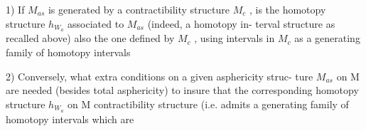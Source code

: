 1)  If $M_{as}$ is generated by a contractibility structure $M_c$ ,  is the
homotopy structure $h_{W_a}$ associated to $M_{as}$  (indeed, a  homotopy in-%
terval structure as recalled above) also the one defined by $M_c$ ,  using
intervals in $M_c$ as a generating family of homotopy intervals

2)  Conversely, what extra conditions on a given asphericity struc-%
ture $M_{as}$ on M are needed (besides total asphericity) to insure that the
corresponding homotopy structure $h_{W_a}$ on M   contractibility structure 
(i.e. admits a generating family of homotopy intervals which are \hand{\uline{\textcolor{black}{contrac-}}}%


